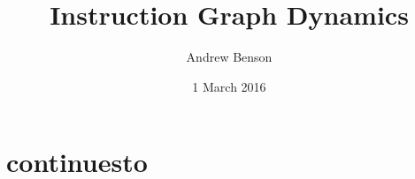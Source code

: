 \documentclass[12pt]{article}
\title{Instruction Graph Dynamics}
\author{Andrew Benson}
\date{1 March 2016}
\begin{document}
\maketitle

\newcommand{\singletonset}[1]{\mathtt{\{#1\}}}

\newcommand{\valid}[1]{\mathtt{#1~valid}}
\newcommand{\defvertices}[2]{\mathtt{#1~definesvertices~#2}}
\newcommand{\connectsto}[3]{\mathtt{#1~connectsto~#2~in~#3}}
\newcommand{\iconnectsto}[3]{\mathtt{#1~connectsto_{index}~#2~in~#3}}
\newcommand{\accesses}[3]{\mathtt{#1~accesses~#2~in~#3}}
\newcommand{\startsat}[3]{\mathtt{#1~startsat~#2~in~#3}}
\newcommand{\dystate}[4]{\mathtt{#1~with~(#2,~#3,~#4)}}
\newcommand{\continuesto}[2]{\mathtt{#1~continuesto~#2}}
\newcommand{\continuestoend}[1]{\mathtt{#1~continuesto~End~with~(V,~inputs,~outputs)}}
\newcommand{\terminates}[2]{\mathtt{#1~terminates~doing~#2}}
\newcommand{\programdoes}[3]{\mathtt{#1~does~#2~on~#3}}

\newcommand{\emptyprogram}{\mathtt{EmptyProgram}}
\newcommand{\program}[2]{\mathtt{Program(#1,~#2)}}
\newcommand{\start}[1]{\mathtt{Start(#1)}}
\newcommand{\singleton}[1]{\mathtt{Singleton(#1)}}
\newcommand{\cons}[2]{\mathtt{Cons(#1,~#2)}}
\newcommand{\vertex}[2]{\mathtt{Vertex(#1,~#2)}}
\newcommand{\doonce}[2]{\mathtt{Do(#1,~#2)}}
\newcommand{\dountil}[3]{\mathtt{DoUntil(#1,~#2,~#3)}}
\newcommand{\conditional}[3]{\mathtt{Conditional(#1,~#2,~#3)}}
\newcommand{\goto}[1]{\mathtt{GoTo(#1)}}
\newcommand{\next}[1]{\mathtt{Next(#1)}}
\newcommand{\finalvertex}[0]{\mathtt{End}}

\section{continuesto}
\end{document}
